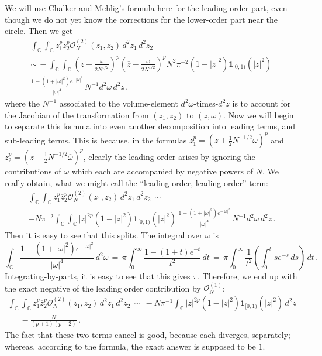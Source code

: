 \documentclass[12pt]{report}
\newcommand{\C}{\mathbb{C}}
\newcommand{\be}{\begin{equation}}
\newcommand{\ee}{\end{equation}}
\theoremstyle{definition}
\begin{document}
We will use Chalker and Mehlig's formula here for the leading-order part, even though we do not yet know
the corrections for the lower-order part near the circle.
Then we get
\begin{multline}
\int_{\C} \int_{\C} z_1^p \overline{z}_2^p \mathcal{O}_N^{(2)}(z_1,z_2)\, d^2z_1\, d^2z_2\\
\sim\, - \int_{\C} \int_{\C} \left(z+\frac{\omega}{2N^{1/2}}\right)^p \left(\overline{z}-\frac{\overline{\omega}}{2N^{1/2}}\right)^p N^2 \pi^{-2} (1-|z|^2) \mathbf{1}_{[0,1)}(|z|^2)\,\\ \frac{1-(1+|\omega|^2)e^{-|\omega|^2}}{|\omega|^4}\, N^{-1} d^2\omega\, d^2z\, ,
\end{multline}
where the $N^{-1}$ associated to the volume-element $d^2\omega$-times-$d^2z$ is to account for the Jacobian of the transformation from $(z_1,z_2)$ to $(z,\omega)$.
Now we will begin to separate this formula into even another decomposition into leading terms, and sub-leading terms.
This is because, in the formulas $z_1^p = (z+\frac{1}{2}N^{-1/2}\omega)^p$ and $\overline{z}_2^p = (\overline{z}-\frac{1}{2}N^{-1/2}\overline{\omega})^p$,
clearly the leading order arises by ignoring the contributions of $\omega$ which each are accompanied by negative powers of $N$.
We really obtain, what we might call the ``leading order, leading order'' term:
\begin{multline}
\int_{\C} \int_{\C} z_1^p \overline{z}_2^p \mathcal{O}_N^{(2)}(z_1,z_2)\, d^2z_1\, d^2z_2\,
\sim\, \\ - N \pi^{-2} \int_{\C} \int_{\C} |z|^{2p}(1-|z|^2) \mathbf{1}_{[0,1)}(|z|^2)\, \frac{1-(1+|\omega|^2)e^{-|\omega|^2}}{|\omega|^4}\, N^{-1} d^2\omega\, d^2z\, .
\end{multline}
Then it is easy to see that this splits. The integral over $\omega$ is 
\be
\int_{\C} \frac{1-(1+|\omega|^2)e^{-|\omega|^2}}{|\omega|^4}\, d^2\omega\,
=\, \pi \int_0^{\infty} \frac{1-(1+t)e^{-t}}{t^2}\, dt\,
=\, \pi \int_0^{\infty} \frac{1}{t^2} \left(\int_0^t s e^{-s}\, ds\right)\, dt\, .
\ee
Integrating-by-parts, it is easy to see that this gives $\pi$.
Therefore, we end up with the exact negative of the leading order contribution by $\mathcal{O}_N^{(1)}$:
\begin{multline}
\int_{\C} \int_{\C} z_1^p \overline{z}_2^p \mathcal{O}_N^{(2)}(z_1,z_2)\, d^2z_1\, d^2z_2\,
\sim\, - N \pi^{-1} \int_{\C} |z|^{2p}(1-|z|^2) \mathbf{1}_{[0,1)}(|z|^2)\,  d^2z\, \\ =\, -\frac{N}{(p+1)(p+2)}\, .
\end{multline}
The fact that these two terms cancel is good, because each diverges, separately; whereas, according to the formula, the exact answer is supposed to be $1$.
\end{document}
